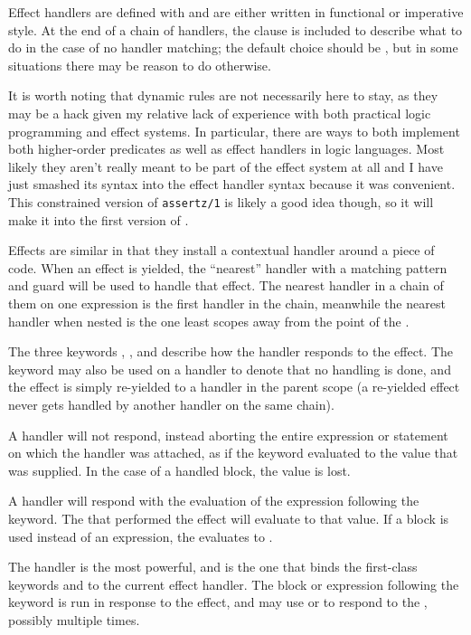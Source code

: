 Effect handlers are defined with  and are either written in functional
or imperative style. At the end of a chain of handlers, the  clause is
included to describe what to do in the case of no handler matching; the default
choice should be , but in some situations there may be reason to
do otherwise.

It is worth noting that dynamic rules are not necessarily here to stay, as
they may be a hack given my relative lack of experience with both practical
logic programming and effect systems. In particular, there are ways to both
implement both higher-order predicates\cite{hologic} as well as effect
handlers in logic languages\cite{prologeffects}. Most likely they aren't really
meant to be part of the effect system at all and I have just smashed its syntax
into the effect handler syntax because it was convenient. This constrained
version of \texttt{assertz/1} is likely a good idea though, so it will make
it into the first version of \Trilogy{}.

Effects are similar in that they install a contextual handler around a piece
of code. When an effect is yielded, the ``nearest'' handler with a matching pattern
and guard will be used to handle that effect. The nearest handler in a chain of them
on one expression is the first handler in the chain, meanwhile the nearest handler when
nested is the one least scopes away from the point of the .

The three keywords , , and  describe how the
handler responds to the effect. The  keyword may also be used on a
handler to denote that no handling is done, and the effect is simply re-yielded
to a handler in the parent scope (a re-yielded effect never gets handled by another
handler on the same chain).

A  handler will not respond, instead aborting the entire expression
or statement on which the handler was attached, as if the  keyword evaluated
to the value that  was supplied. In the case of a handled block, the value
is lost.

A  handler will respond with the evaluation of the expression following
the keyword. The  that performed the effect will evaluate to that value.
If a block is used instead of an expression, the  evaluates to .

The  handler is the most powerful, and is the one that binds the
first-class keywords  and  to the current effect handler.
The block or expression following the  keyword is run in response to
the effect, and may use  or  to respond to the ,
possibly multiple times.

